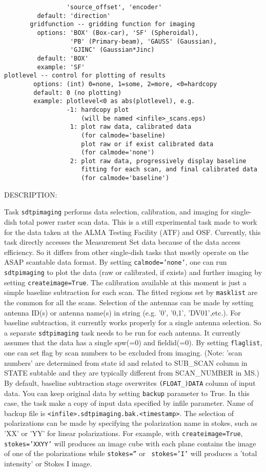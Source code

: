 \begin{verbatim}
                 'source_offset', 'encoder' 
         default: 'direction'
       gridfunction -- gridding function for imaging
         options: 'BOX' (Box-car), 'SF' (Spheroidal), 
                  'PB' (Primary-beam), 'GAUSS' (Gaussian),
                  'GJINC' (Gaussian*Jinc)
         default: 'BOX'
         example: 'SF'
plotlevel -- control for plotting of results
        options: (int) 0=none, 1=some, 2=more, <0=hardcopy
        default: 0 (no plotting)
        example: plotlevel<0 as abs(plotlevel), e.g.
                 -1: hardcopy plot 
                     (will be named <infile>_scans.eps)
                  1: plot raw data, calibrated data 
                     (for calmode='baseline)
                     plot raw or if exist calibrated data 
                     (for calmode='none')
                  2: plot raw data, progressively display baseline 
                     fitting for each scan, and final calibrated data 
                     (for calmode='baseline')  

\end{verbatim}
DESCRIPTION:

Task {\tt sdtpimaging} performs data selection, calibration, and
imaging for single-dish total power raster scan data.  This is a still
experimental task made to work for the data taken at the ALMA Testing
Facility (ATF) and OSF. Currently, this task directly accesses the
Measurement Set data because of the data access efficiency.  So it
differs from other single-dish tasks that mostly operate on the ASAP
scantable data format.  By setting {\tt calmode='none'}, one can run
{\tt sdtpimaging} to plot the data (raw or calibrated, if exists) and
further imaging by setting {\tt createimage=True}.  The calibration
available at this moment is just a simple baseline subtraction for
each scan. The fitted regions set by {\tt masklist} are the common for
all the scans.  Selection of the antennas can be made by setting
antenna ID(s) or antenna name(s) in string (e.g. '0', '0,1',
'DV01',etc.).  For baseline subtraction, it currently works properly
for a single antenna selection.  So a separate {\tt sdtpimaging} task
needs to be run for each antenna.  It currently assumes that the data
has a single spw(=0) and fieldid(=0).  By setting {\tt flaglist}, one
can set flag by scan numbers to be excluded from imaging.  (Note:
'scan numbers' are determined from state id and related to SUB\_SCAN
column in STATE subtable and they are typically different from
SCAN\_NUMBER in MS.)  By default, baseline subtraction stage
overwrites \verb!(FLOAT_)DATA! column of input data. You can keep
original data by setting {\tt backup} parameter to True. In this case,
the task make a copy of input data specified by infile parameter.
Name of backup file is \verb|<infile>.sdtpimaging.bak.<timestamp>|.
The selection of polarizations can be made by specifying the
polarization name in stokes, such as 'XX' or 'YY' for linear
polarizations. For example, with {\tt createimage=True}, {\tt
  stokes='XXYY'} will produces an image cube with each plane contains
the image of one of the polarizations while {\tt stokes=''} or {\tt
  stokes='I'} will produces a 'total intensity' or Stokes I image.

